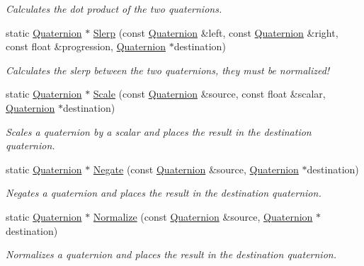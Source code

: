 \begin{DoxyCompactItemize}
\begin{DoxyCompactList}\small\item\em Calculates the dot product of the two quaternions. \end{DoxyCompactList}\item 
static \hyperlink{class_flounder_1_1_quaternion}{Quaternion} $\ast$ \hyperlink{class_flounder_1_1_quaternion_a26d4fd171ceb62db5d6f9a3b84e0656e}{Slerp} (const \hyperlink{class_flounder_1_1_quaternion}{Quaternion} \&left, const \hyperlink{class_flounder_1_1_quaternion}{Quaternion} \&right, const float \&progression, \hyperlink{class_flounder_1_1_quaternion}{Quaternion} $\ast$destination)
\begin{DoxyCompactList}\small\item\em Calculates the slerp between the two quaternions, they must be normalized! \end{DoxyCompactList}\item 
static \hyperlink{class_flounder_1_1_quaternion}{Quaternion} $\ast$ \hyperlink{class_flounder_1_1_quaternion_ac29cb2a206cd19d1bd96a473aa0374a8}{Scale} (const \hyperlink{class_flounder_1_1_quaternion}{Quaternion} \&source, const float \&scalar, \hyperlink{class_flounder_1_1_quaternion}{Quaternion} $\ast$destination)
\begin{DoxyCompactList}\small\item\em Scales a quaternion by a scalar and places the result in the destination quaternion. \end{DoxyCompactList}\item 
static \hyperlink{class_flounder_1_1_quaternion}{Quaternion} $\ast$ \hyperlink{class_flounder_1_1_quaternion_a449c44d82a12a55a90d3f8461c9f1ab0}{Negate} (const \hyperlink{class_flounder_1_1_quaternion}{Quaternion} \&source, \hyperlink{class_flounder_1_1_quaternion}{Quaternion} $\ast$destination)
\begin{DoxyCompactList}\small\item\em Negates a quaternion and places the result in the destination quaternion. \end{DoxyCompactList}\item 
static \hyperlink{class_flounder_1_1_quaternion}{Quaternion} $\ast$ \hyperlink{class_flounder_1_1_quaternion_aad79217aa0a508eb7df64043ca40c410}{Normalize} (const \hyperlink{class_flounder_1_1_quaternion}{Quaternion} \&source, \hyperlink{class_flounder_1_1_quaternion}{Quaternion} $\ast$destination)
\begin{DoxyCompactList}\small\item\em Normalizes a quaternion and places the result in the destination quaternion. \end{DoxyCompactList}\item 

\end{DoxyCompactItemize}
